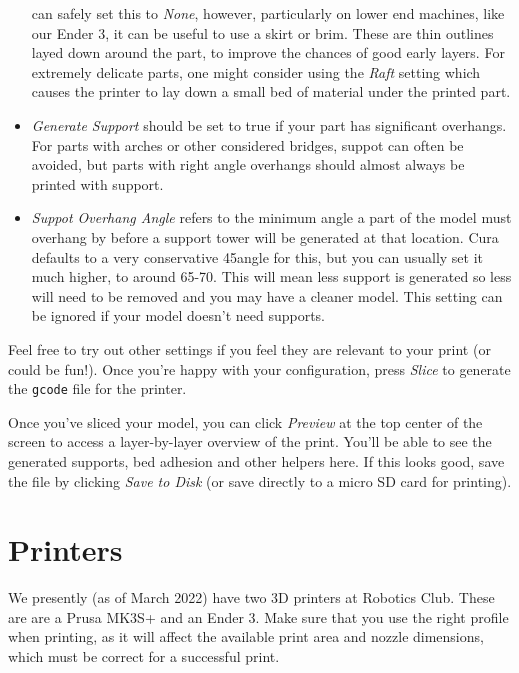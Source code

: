 \documentclass[12pt]{report}
\begin{document}
\begin{itemize}
        can safely set this to \textit{None}, however, particularly on lower end
        machines, like our Ender 3, it can be useful to use a skirt or brim.
        These are thin outlines layed down around the part, to improve the
        chances of good early layers. For extremely delicate parts, one might
        consider using the \textit{Raft} setting which causes the printer to lay
        down a small bed of material under the printed part.
    \item \textit{Generate Support} should be set to true if your part has
        significant overhangs. For parts with arches or other considered
        bridges, suppot can often be avoided, but parts with right angle
        overhangs should almost always be printed with support.
    \item \textit{Suppot Overhang Angle} refers to the minimum angle a part of
        the model must overhang by before a support tower will be generated at
        that location. Cura defaults to a very conservative 45\textdegree angle
        for this, but you can usually set it much higher, to around
        65-70\textdegree. This will mean less support is generated so less will
        need to be removed and you may have a cleaner model. This setting can be
        ignored if your model doesn't need supports.
\end{itemize}

Feel free to try out other settings if you feel they are relevant to your print
(or could be fun!). Once you're happy with your configuration, press
\textit{Slice} to generate the \texttt{gcode} file for the printer. \par
Once you've sliced your model, you can click \textit{Preview} at the top center
of the screen to access a layer-by-layer overview of the print. You'll be able
to see the generated supports, bed adhesion and other helpers here. If this
looks good, save the file by clicking \textit{Save to Disk} (or save directly
to a micro SD card for printing).

\section*{Printers}
\label{sec:printers}

We presently (as of March 2022) have two 3D printers at Robotics Club. These are
are a Prusa MK3S+ and an Ender 3. Make sure that you use the right profile when
printing, as it will affect the available print area and nozzle dimensions,
which must be correct for a successful print.
\end{document}
